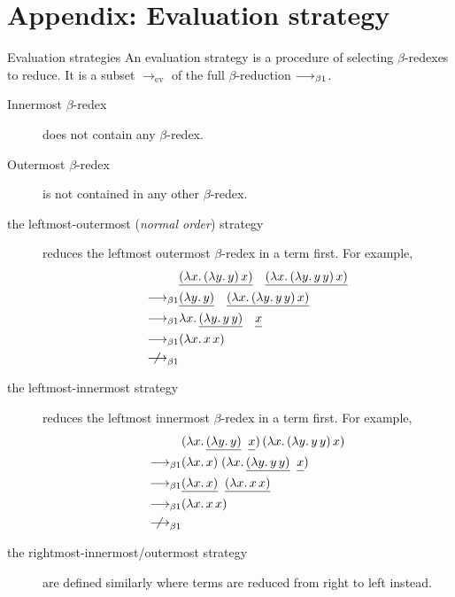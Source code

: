 \section{Appendix: Evaluation strategy}
\begin{frame}[allowframebreaks]{Evaluation strategies}
An evaluation strategy is a procedure of selecting $\beta$-redexes
to reduce. It is a subset $\longrightarrow_{\mathrm{ev}}$ of the full
$\beta$-reduction $\longrightarrow_{\beta1}$.

\begin{description}
  \item[Innermost $\beta$-redex] does not contain any $\beta$-redex.
  \item[Outermost $\beta$-redex] is not contained in any other $\beta$-redex.
\end{description}

\begin{description}
  \item[the leftmost-outermost (\emph{normal order}) strategy] reduces the leftmost outermost
    $\beta$-redex in a term first. For example, 
    \begin{align*}
      & 
      \underline{(\lambda x.\, (\lambda y.\, y)\,x)}\quad
      \underline{(\lambda x.\, (\lambda y.\, y\,y)\,x)}
      \\
      \onereduce &
      \underline{(\lambda y.\, y)}\quad
      \underline{(\lambda x.\, (\lambda y.\, y\,y)\, x)} \\
      \onereduce &
      \lambda x.\, \underline{(\lambda y.\, y\,y)}\quad
      \underline{\vphantom{(\lambda}x} \\
      \onereduce & (\lambda x.\, x\,x) \\
      \notonereduce
    \end{align*}
  \item[the leftmost-innermost strategy] reduces the leftmost innermost
    $\beta$-redex in a term first. For example, 
    \begin{align*}
      & (\lambda x.\, \underline{(\lambda y.\,
        y)}\;\;\underline{\vphantom{(\lambda} x})\,
      (\lambda x.\, (\lambda y.\, y\, y)\,x) \\
      \onereduce & (\lambda x.\,x)\;
      (\lambda x.\, \underline{(\lambda y.\, y\,
        y)}\;\;\underline{\vphantom{(\lambda}x}) \\
      \onereduce & \underline{(\lambda x.\,x)}\;\;\underline{(\lambda x.\, x\,x)} \\
      \onereduce & (\lambda x.\, x\, x) \\
      \notonereduce
    \end{align*}
  \item[the rightmost-innermost/outermost strategy]
    are defined similarly where terms are reduced from right to left
    instead.
\end{description}
\end{frame}

